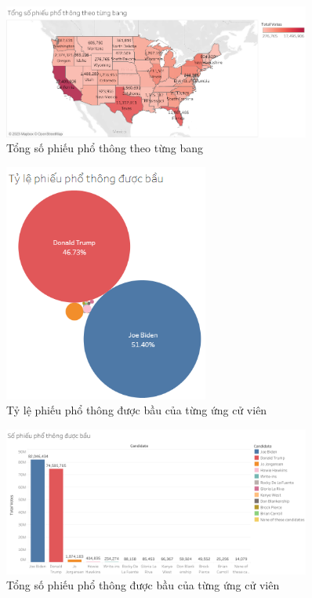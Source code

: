 \documentclass[14pt, a4paper]{article}
\numberwithin{equation}{section}
\numberwithin{figure}{section}
\numberwithin{dl}{section}
\numberwithin{md}{section}
\numberwithin{bd}{section}
\numberwithin{dn}{section}
\numberwithin{hq}{section}
\begin{document}
    \begin{figure}[h!]
        \centering
        \includegraphics[width=0.9\textwidth]{Popular_Votes_States_by_Color.png}
        \caption{Tổng số phiếu phổ thông theo từng bang}
    \end{figure}

    \begin{figure}[h!]
        \centering
        \includegraphics[width=0.6\textwidth]{Percentage_Total_Candidates_Bubble_Chart.png}
        \caption{Tỷ lệ phiếu phổ thông được bầu của từng ứng cử viên}
    \end{figure}

    \begin{figure}[h!]
        \centering
        \includegraphics[width=0.9\textwidth]{Total_Popular_Votes_Candidates_Bar_Chart.png}
        \caption{Tổng số phiếu phổ thông được bầu của từng ứng cử viên}
    \end{figure}
\end{document}
